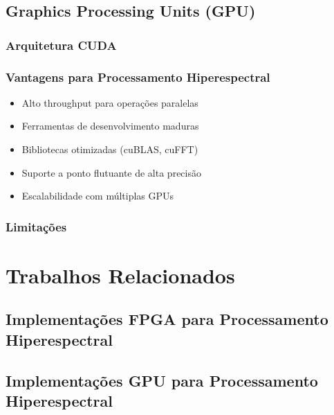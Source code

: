 \subsection{Graphics Processing Units (GPU)}\label{subsec:gpu}
\subsubsection{Arquitetura CUDA}

\subsubsection{Vantagens para Processamento Hiperespectral}
\begin{itemize}
    \item Alto throughput para operações paralelas
    \item Ferramentas de desenvolvimento maduras
    \item Bibliotecas otimizadas (cuBLAS, cuFFT)
    \item Suporte a ponto flutuante de alta precisão
    \item Escalabilidade com múltiplas GPUs
\end{itemize}

\subsubsection{Limitações}

\section{Trabalhos Relacionados}\label{sec:trabalhos_relacionados}

\subsection{Implementações FPGA para Processamento Hiperespectral}

\subsection{Implementações GPU para Processamento Hiperespectral}

